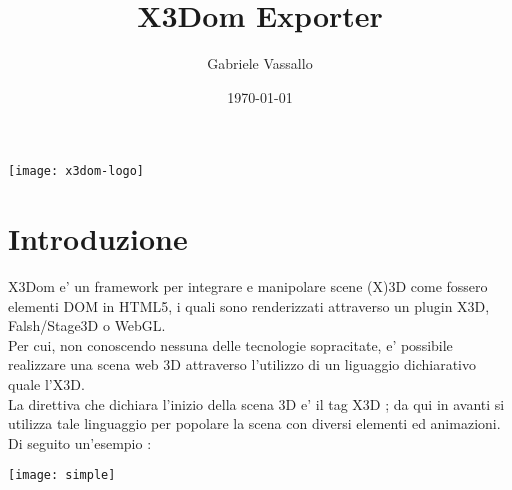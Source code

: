 \documentclass[11pt]{article}
\title{X3Dom Exporter}
\date{\today}
\author{Gabriele Vassallo}
\begin{document}

        \maketitle 
        \vfill
        \center \texttt{[image: x3dom-logo]}

\clearpage 
\tableofcontents
\clearpage 

\section{Introduzione}
\begin{flushleft}
X3Dom e' un framework per integrare e manipolare scene (X)3D come fossero elementi DOM in HTML5, i quali sono renderizzati attraverso un plugin X3D, Falsh/Stage3D o WebGL. \\
Per cui, non conoscendo nessuna delle tecnologie sopracitate, e' possibile realizzare una scena web 3D attraverso l'utilizzo di un liguaggio dichiarativo quale l'X3D. \\
La direttiva che dichiara l'inizio della scena 3D e' il tag X3D ; da qui in avanti si utilizza tale linguaggio per popolare la scena con diversi elementi ed animazioni. 
Di seguito un'esempio : 

\vspace{10mm}
\small 
\center \texttt{[image: simple]}
\end{flushleft}
\clearpage
\end{document}
